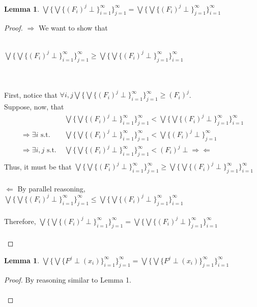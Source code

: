 \documentclass{westhesis}
\theoremstyle{plain}
\newtheorem{lemma}[thm]{Lemma}
\theoremstyle{definition}
\begin{document}
 \begin{lemma} $\bigvee\{\bigvee\{(F_i)^j \perp\}^{\infty}_{i=1}\}^{\infty}_{j=1}= \bigvee\{\bigvee\{(F_i)^j \perp\}^{\infty}
 _{j=1}\}^{\infty}_{i=1}$\\
 \end{lemma}
 \begin{proof}
 $\Rightarrow$ We want to show that\\ \\ \centerline{$\bigvee\{\bigvee\{(F_i)^j \perp\}^{\infty}_{i=1}\}^{\infty}
 _{j=1} \geq  \bigvee\{\bigvee\{(F_i)^j \perp\}^{\infty}_{j=1}\}^{\infty}_{i=1}$} \\ \\ First, notice that $\forall i, j \bigvee\{\bigvee
 \{(F_i)^j \perp\}^{\infty}_{i=1}\}^{\infty}_{j=1} \geq (F_i)^j$. \\
 Suppose, now, that 
 \begin{align*}
 &\bigvee\{\bigvee\{(F_i)^j \perp\}^{\infty}_{i=1}\}^{\infty}_{j=1} < \bigvee\{\bigvee\{(F_i)^j \perp\}^{\infty}_{j=1}\}^{\infty}_{i=1}\\ 
 \Rightarrow \exists i \text{ s.t. \ \  \ } &\bigvee\{\bigvee\{(F_i)^j \perp\}^{\infty}_{i=1}\}^{\infty}_{j=1} < \bigvee\{(F_i)^j \perp\}
 ^{\infty}_{j=1}\\
 \Rightarrow \exists i, j \text{ s.t. } &\bigvee\{\bigvee\{(F_i)^j \perp\}^{\infty}_{i=1}\}^{\infty}_{j=1} < (F_i)^j \perp 
 \Rightarrow\Leftarrow\\
 \end{align*}
 Thus, it must be that $\bigvee\{\bigvee\{(F_i)^j \perp\}^{\infty}_{i=1}\}^{\infty}_{j=1} \geq  \bigvee\{\bigvee\{(F_i)^j \perp\}^{\infty}
 _{j=1}\}^{\infty}_{i=1}$ \\ \\
 $\Leftarrow$ By parallel reasoning, $\bigvee\{\bigvee\{(F_i)^j \perp\}^{\infty}_{i=1}\}^{\infty}_{j=1} \leq  \bigvee\{\bigvee\{(F_i)^j 
 \perp\}^{\infty}_{j=1}\}^{\infty}_{i=1}$ \\ \\
 Therefore, $\bigvee\{\bigvee\{(F_i)^j \perp\}^{\infty}_{i=1}\}^{\infty}_{j=1} = \bigvee\{\bigvee\{(F_i)^j \perp\}^{\infty}_{j=1}\}
 ^{\infty}_{i=1}$ \\ \\
 \end{proof}
 \begin{lemma}
 $\bigvee\{\bigvee\{F^j \perp(x_i)\}^{\infty}_{i=1}\}^{\infty}_{j=1} = \bigvee\{\bigvee\{F^j \perp(x_i)\}^{\infty}
 _{j=1}\}^{\infty}_{i=1}$\\ 
 \end{lemma}
 \begin{proof} 
 By reasoning similar to Lemma 1. \\ \\
 \end{proof}
 
\end{document}
